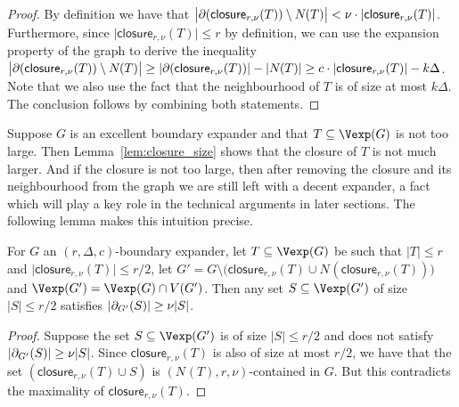 \documentclass{theoretics}
\providecommand{\abs}[1]{\lvert#1\rvert}
\newcommand{\boundary}[1]{\ensuremath{\partial #1}}
\newcommand{\Setsize}[1]{\bigl\lvert#1\bigr\rvert}
\newcommand{\setsize}[1]{\lvert#1\rvert}
\newcommand{\reflem}[1]{Lemma~\ref{#1}}
\newcommand{\neigh}[2][]{N_{{#1}}(#2)}
\newcommand{\uniqueNeigh}[2][]{\boundary_{{#1}} ({#2})}
\newcommand{\GdegMax}{\Delta}
\newcommand{\gdegmax}{\GdegMax}
\newcommand{\contained}[3]{$(#1, #2, #3)$-contained}
\newcommand{\closure}[2][]{\mathsf{closure}_{{#1}}(#2)}
\newcommand{\expansionconst}{c}
\newcommand{\almostcontained}{\nu}
\newcommand{\setsizemax}{k}
\numberwithin{equation}{section}
\begin{document}
\begin{proof}
  By definition we have that 
  $ \Setsize{ 
  \uniqueNeigh{\closure[r, \almostcontained]{T}}  \setminus \neigh{T} } < 
  \nu \cdot \setsize{\closure[r, \almostcontained]{T}}$.
  Furthermore, since 
  $\setsize{\closure[r, \almostcontained]{T}} \leq r$ by definition,
  we can use the expansion property of the graph to derive 
  the inequality
  $\Setsize{
    \uniqueNeigh{\closure[r, \almostcontained]{T}} \setminus \neigh{T}
  } 
  \ge \setsize{\uniqueNeigh{\closure[r, \almostcontained]{T}}} - \setsize{ \neigh{T} }
  \ge  
  \expansionconst \cdot \setsize{\closure[r, \almostcontained]{T}} - 
  \setsizemax  \GdegMax 
  $. Note that we also use the fact that the neighbourhood of $T$ is of size at most 
  $\setsizemax \GdegMax$. 
  The conclusion follows by combining both statements.
\end{proof}

  Suppose $G$ is an excellent boundary expander and that $T \subseteq \Vexp(G)$
  is not too large. Then \reflem{lem:closure_size} shows that the
  closure of $T$ is not much larger.  
  And if the closure is not too large, then
  after removing the closure and its neighbourhood from the graph
  we are still left with a decent expander,
  a fact which will play a key role in the technical arguments in later
  sections. The following lemma makes this intuition precise.


\begin{lemma}\label{lem:closure_expansion}
  For $G$ an 
  $(r, \gdegmax, \expansionconst )$-boundary expander,
  let $T \subseteq \Vexp(G)$ be such that $\setsize{T} \le r$ and
  $\setsize{ \closure[r, \almostcontained]{T} } \le r/2$,
  let $G' = G \setminus \bigl( \closure[r, \almostcontained]{T} \cup 
  \neigh{\closure[r, \almostcontained]{T}} \bigr)$ and
  $\Vexp(G') = \Vexp(G) \cap V(G')$.
  Then any set $S \subseteq \Vexp(G')$ of size $\setsize{S} \le r/2$
  satisfies
$    \abs{ \uniqueNeigh[G']{S}} \ge 
    \almostcontained \setsize{S} $. \end{lemma}

\begin{proof}
  Suppose the set $S \subseteq \Vexp(G')$ is of size $\setsize{S} \le r/2$ and 
  does not satisfy $    \abs{ \uniqueNeigh[G']{S}} \ge 
    \almostcontained \setsize{S} $.
  Since
  $\closure[r, \almostcontained]{T}$ is also of size at most
  $r/2$, we have that
the set
  $(\closure[r, \almostcontained]{T} \cup S)$ is 
  \contained{\neigh{T}}{r}{\almostcontained} in $G$.
  But this contradicts the maximality of $\closure[r, \almostcontained]{T}$.
\end{proof}
\end{document}
